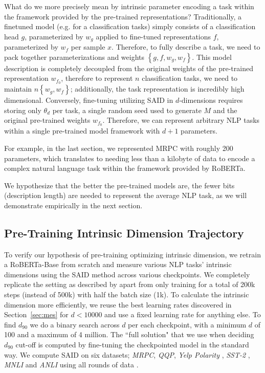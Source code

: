 What do we more precisely mean by intrinsic parameter encoding a task within the framework provided by the pre-trained representations? Traditionally, a finetuned model (e.g. for a classification tasks) simply consists of a classification head $g$, parameterized by $w_g$ applied to fine-tuned representations $f$, parameterized by $w_f$ per sample $x$. Therefore, to fully describe a task, we need to pack together parameterizations and weights $\left\{g,f, w_g, w_f\right\}$. This model description is completely decoupled from the original weights of the pre-trained representation $w_{f_0}$, therefore to represent $n$ classification tasks, we need to maintain $n \left\{w_g, w_f\right\}$; additionally, the task representation is incredibly high dimensional. Conversely, fine-tuning utilizing SAID in $d$-dimensions requires storing only $\theta_d$ per task, a single random seed used to generate $M$ and the original pre-trained weights $w_{f_0}$. Therefore, we can represent arbitrary NLP tasks within a single pre-trained model framework with $d+1$ parameters.

For example, in the last section, we represented MRPC with roughly 200 parameters, which translates to needing less than a kilobyte of data to encode a complex natural language task within the framework provided by RoBERTa.

We hypothesize that the better the pre-trained models are, the fewer bits (description length) are needed to represent the average NLP task, as we will demonstrate empirically in the next section.

\subsection{Pre-Training Intrinsic Dimension Trajectory}
\label{sec:trajectory}
To verify our hypothesis of pre-training optimizing intrinsic dimension, we retrain a RoBERTa-Base from scratch and measure various NLP tasks' intrinsic dimensions using the SAID method across various checkpoints. We completely replicate the setting as described by \citep{ROBERTA} apart from only training for a total of 200k steps (instead of 500k) with half the batch size (1k). To calculate the intrinsic dimension more efficiently, we reuse the best learning rates discovered in Section~\ref{sec:mes} for $d < 10000$ and use a fixed learning rate for anything else. To find $d_{90}$ we do a binary search across $d$ per each checkpoint, with a minimum $d$ of 100 and a maximum of 4 million. The ``full solution" that we use when deciding $d_{90}$ cut-off is computed by fine-tuning the checkpointed model in the standard way. We compute SAID on six datasets; \textit{MRPC}, \textit{QQP}, \textit{Yelp Polarity} \citep{yelp_polarity}, \textit{SST-2} \citep{sst2}, \textit{MNLI} \citep{mnli} and \textit{ANLI} using all rounds of data \citep{anli}.

